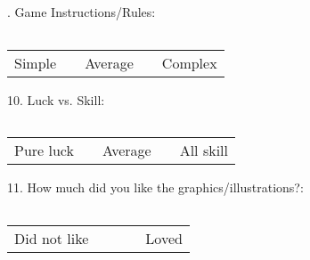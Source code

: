 . Game Instructions/Rules:
\begin{center}
 	\begin{tabular}{| p{1cm} | p{1cm} | p{1cm} | p{1cm} | p{1cm} |}
    	\hline
     	&  &  &  &  \\ \hline
  	\end{tabular}
\end{center}
\begin{center}
	\begin{tabular}{ >{\centering\arraybackslash}p{1cm}  >{\centering\arraybackslash}p{1cm}  >{\centering\arraybackslash}p{1cm}  >{\centering\arraybackslash}p{1cm}  >{\centering\arraybackslash}p{1cm} }
    Simple &  & Average &  & Complex \\ 
 	\end{tabular}
\end{center}

10. Luck vs. Skill:
\begin{center}
 	\begin{tabular}{| p{1cm} | p{1cm} | p{1cm} | p{1cm} | p{1cm} |}
    	\hline
     	&  &  &  &  \\ \hline
  	\end{tabular}
\end{center}
\begin{center}
	\begin{tabular}{ >{\centering\arraybackslash}p{1cm}  >{\centering\arraybackslash}p{1cm}  >{\centering\arraybackslash}p{1cm}  >{\centering\arraybackslash}p{1cm}  >{\centering\arraybackslash}p{1cm} }
    Pure luck &  & Average &  & All skill \\ 
 	\end{tabular}
\end{center}

11. How much did you like the graphics/illustrations?:
\begin{center}
 	\begin{tabular}{| p{1cm} | p{1cm} | p{1cm} | p{1cm} | p{1cm} |}
    	\hline
     	&  &  &  &  \\ \hline
  	\end{tabular}
\end{center}
\begin{center}
	\begin{tabular}{ >{\centering\arraybackslash}p{1cm}  >{\centering\arraybackslash}p{1cm}  >{\centering\arraybackslash}p{1cm}  >{\centering\arraybackslash}p{1cm}  >{\centering\arraybackslash}p{1cm} }
    Did not like &  &  &  & Loved \\ 
 	\end{tabular}
\end{center}

